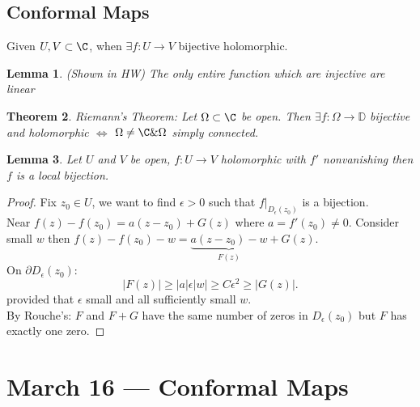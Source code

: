 \documentclass[a4paper]{article}
\newtheorem{thm}{Theorem}[section]
\newtheorem{lem}[thm]{Lemma}
\begin{document}
\subsection{Conformal Maps}
Given $U,V\subset \C$, when $\exists f:U \to V$ bijective holomorphic.\\
\begin{lem}
    (Shown in HW) The only entire function which are injective are linear 
\end{lem}
\begin{thm}
    Riemann's Theorem: Let $\Omega\subset \C$ be open. Then $\exists f:\Omega\to \mathbb{D}$ bijective and holomorphic $\iff$ $\Omega\neq \C \& \Omega$ simply connected. 
\end{thm}
\begin{lem}
    Let $U$ and $V$ be open, $f:U\to V$ holomorphic with $f'$ nonvanishing then $f$ is a local bijection. 
\end{lem}
\begin{proof}
    Fix $z_0\in U$, we want to find $\epsilon>0$ such that $f|_{D_\epsilon(z_0)}$ is a bijection. \\
    Near $f(z)-f(z_0)=a(z-z_0)+G(z)$ where $a=f'(z_0)\neq 0$. Consider small $w$ then $f(z)-f(z_0)-w=\underbrace{a(z-z_0)-w}_{F(z)}+G(z)$. \\
    On $\partial D_\epsilon(z_0):$ \[
    |F(z)|\geq |a|\epsilon|w|\geq C\epsilon^2 \geq |G(z)|
    .\] 
    provided that $\epsilon$ small and all sufficiently small $w$. \\
    By Rouche's: $F$ and $F+G$ have the same number of zeros in $D_\epsilon(z_0)$ but $F$ has exactly one zero. 
\end{proof}
\newpage
\section{March 16 --- Conformal Maps}
\end{document}
